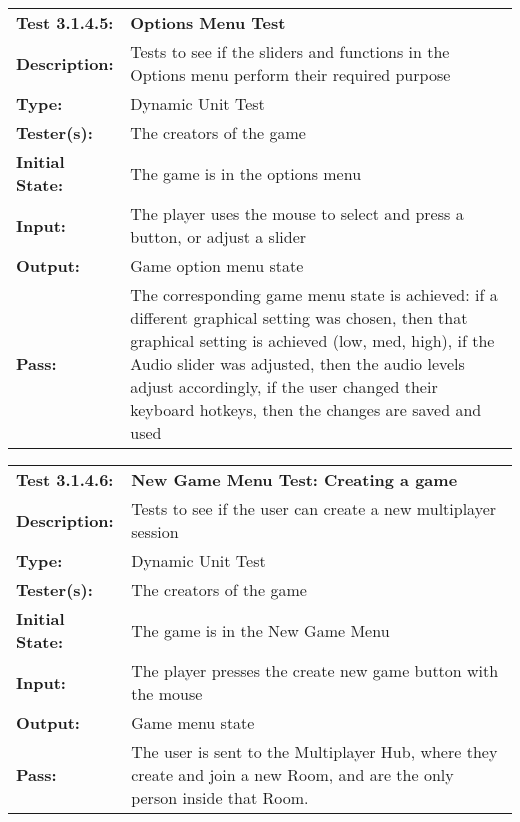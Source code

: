 \documentclass[12pt, titlepage]{article}
\begin{document}
\begin{enumerate}
\begin{mdframed}[linewidth=1pt]
\begin{tabularx}{\textwidth}{@{}p{3cm}X@{}}
{\bf Test 3.1.4.5:} & {\bf Options Menu Test}\\[\baselineskip]
{\bf Description:} & Tests to see if the sliders and functions in the Options menu perform their required purpose\\[0.5\baselineskip]
{\bf Type:} & Dynamic Unit Test\\[0.5\baselineskip]
{\bf Tester(s):} & The creators of the game\\[0.5\baselineskip]
{\bf Initial State:} & The game is in the options menu\\[0.5\baselineskip]
{\bf Input:} & The player uses the mouse to select and press a button, or adjust a slider \\[0.5\baselineskip]
{\bf Output:} & Game option menu state\\[0.5\baselineskip]
{\bf Pass:} & The corresponding game menu state is achieved: if a different graphical setting was chosen, then that graphical setting is achieved (low, med, high), if the Audio slider was adjusted, then the audio levels adjust accordingly, if the user changed their keyboard hotkeys, then the changes are saved and used
\end{tabularx}
\end{mdframed}

\begin{mdframed}[linewidth=1pt]
\begin{tabularx}{\textwidth}{@{}p{3cm}X@{}}
{\bf Test 3.1.4.6:} & {\bf New Game Menu Test: Creating a game}\\[\baselineskip]
{\bf Description:} & Tests to see if the user can create a new multiplayer session\\[0.5\baselineskip]
{\bf Type:} & Dynamic Unit Test\\[0.5\baselineskip]
{\bf Tester(s):} & The creators of the game\\[0.5\baselineskip]
{\bf Initial State:} & The game is in the New Game Menu\\[0.5\baselineskip]
{\bf Input:} & The player presses the create new game button with the mouse \\[0.5\baselineskip]
{\bf Output:} & Game menu state\\[0.5\baselineskip]
{\bf Pass:} & The user is sent to the Multiplayer Hub, where they create and join a new Room, and are the only person inside that Room.
\end{tabularx}
\end{mdframed}


\end{enumerate}
\end{document}
